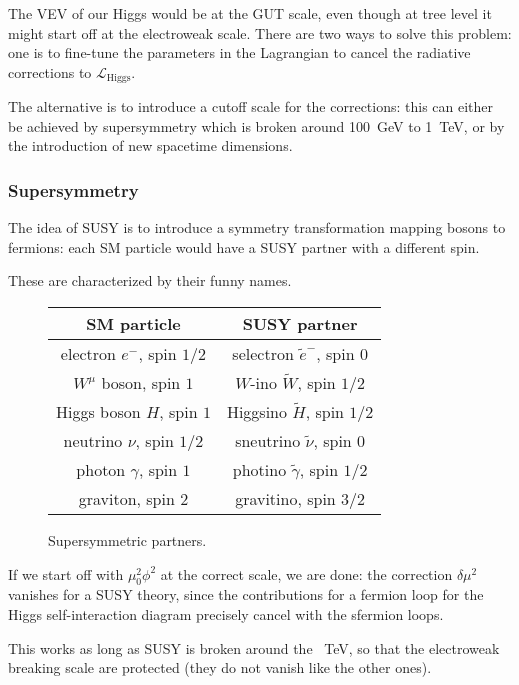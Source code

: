 \documentclass[main.tex]{subfiles}
\begin{document}
The VEV of our Higgs would be at the GUT scale, even though at tree level it might start off at the electroweak scale. 
There are two ways to solve this problem: 
one is to fine-tune the parameters in the Lagrangian to cancel the radiative corrections to \(\mathscr{L} _{\text{Higgs}}\). 

The alternative is to introduce a cutoff scale for the corrections: this can either be achieved by supersymmetry which is broken around \SI{100}{GeV} to \SI{1}{TeV}, or by the introduction of new spacetime dimensions.

\subsubsection{Supersymmetry}

The idea of SUSY is to introduce a symmetry transformation mapping bosons to fermions: each SM particle would have a SUSY partner with a different spin. 

These are characterized by their funny names.
\begin{figure}
\centering
\begin{tabular}{cc}
SM particle & SUSY partner\\
\hline
electron \(e^{-}\), spin \(1/2\) & selectron \(\widetilde{e}^{-}\), spin \(0\) \\
\(W^{\mu }\) boson, spin \(1\) & \(W\)-ino \(\widetilde{W}\), spin \(1/2\) \\
Higgs boson \(H\), spin \(1\) & Higgsino \(\widetilde{H}\), spin \(1/2\) \\
neutrino \(\nu \), spin \(1/2\) & sneutrino \(\widetilde{\nu }\), spin \(0\) \\
photon \(\gamma  \), spin \(1\) & photino \(\widetilde{\gamma  }\), spin \(1/2\) \\
graviton, spin \(2\) & gravitino, spin \(3/2\) 
\end{tabular}
\label{tab:supersymmetric-partners}
\caption{Supersymmetric partners.}
\end{figure}

If we start off with \(\mu_0^2 \phi^2\) at the correct scale, we are done: the correction \(\delta \mu^2\) vanishes for a SUSY theory, since the contributions for a fermion loop for the Higgs self-interaction diagram precisely cancel with the sfermion loops. 

This works as long as SUSY is broken around the \SI{}{TeV}, so that the electroweak breaking scale are protected (they do not vanish like the other ones). 
\end{document}
